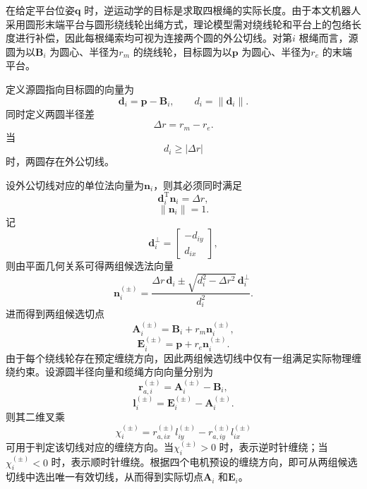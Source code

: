 在给定平台位姿$\bm q$ 时，逆运动学的目标是求取四根绳的实际长度。由于本文机器人采用圆形末端平台与圆形绕线轮出绳方式，理论模型需对绕线轮和平台上的包络长度进行补偿，因此每根绳索均可视为连接两个圆的外公切线。对第$i$ 根绳而言，源圆为以$\bm B_i$ 为圆心、半径为$r_m$ 的绕线轮，目标圆为以$\bm p$ 为圆心、半径为$r_e$ 的末端平台。

定义源圆指向目标圆的向量为
\begin{equation}
  \bm d_i=\bm p-\bm B_i,\qquad d_i=\|\bm d_i\|. \label{eq:ch3-di}
\end{equation}
同时定义两圆半径差
\begin{equation}
  \Delta r=r_m-r_e. \label{eq:ch3-dr}
\end{equation}
当
\begin{equation}
  d_i\ge |\Delta r| \label{eq:ch3-tangent-exist}
\end{equation}
时，两圆存在外公切线。

设外公切线对应的单位法向量为$\bm n_i$，则其必须同时满足
\begin{equation}
  \bm d_i^{\mathrm T}\bm n_i=\Delta r, \label{eq:ch3-ni-cond1}
\end{equation}
\begin{equation}
  \|\bm n_i\|=1. \label{eq:ch3-ni-cond2}
\end{equation}
记
\begin{equation}
  \bm d_i^\perp=
  \begin{bmatrix}
    -d_{iy} \\ d_{ix}
  \end{bmatrix},
\end{equation}
则由平面几何关系可得两组候选法向量
\begin{equation}
  \bm n_i^{(\pm)} = \frac{\Delta r\,\bm d_i \pm \sqrt{d_i^2-\Delta r^2}\,\bm d_i^\perp}{d_i^2}. \label{eq:ch3-ni-pm}
\end{equation}
进而得到两组候选切点
\begin{equation}
  \bm A_i^{(\pm)}=\bm B_i+r_m\bm n_i^{(\pm)}, \label{eq:ch3-ai-pm}
\end{equation}
\begin{equation}
  \bm E_i^{(\pm)}=\bm p+r_e\bm n_i^{(\pm)}. \label{eq:ch3-ei-pm}
\end{equation}
由于每个绕线轮存在预定缠绕方向，因此两组候选切线中仅有一组满足实际物理缠绕约束。设源圆半径向量和缆绳方向向量分别为
\begin{equation}
  \bm r_{a,i}^{(\pm)}=\bm A_i^{(\pm)}-\bm B_i,
\end{equation}
\begin{equation}
  \bm l_i^{(\pm)}=\bm E_i^{(\pm)}-\bm A_i^{(\pm)}.
\end{equation}
则其二维叉乘
\begin{equation}
  \chi_i^{(\pm)}= r_{a,ix}^{(\pm)} l_{iy}^{(\pm)}- r_{a,iy}^{(\pm)} l_{ix}^{(\pm)} \label{eq:ch3-winding-cross}
\end{equation}
可用于判定该切线对应的缠绕方向。当$\chi_i^{(\pm)}>0$ 时，表示逆时针缠绕；当$\chi_i^{(\pm)}<0$ 时，表示顺时针缠绕。根据四个电机预设的缠绕方向，即可从两组候选切线中选出唯一有效切线，从而得到实际切点$\bm A_i$ 和$\bm E_i$。

